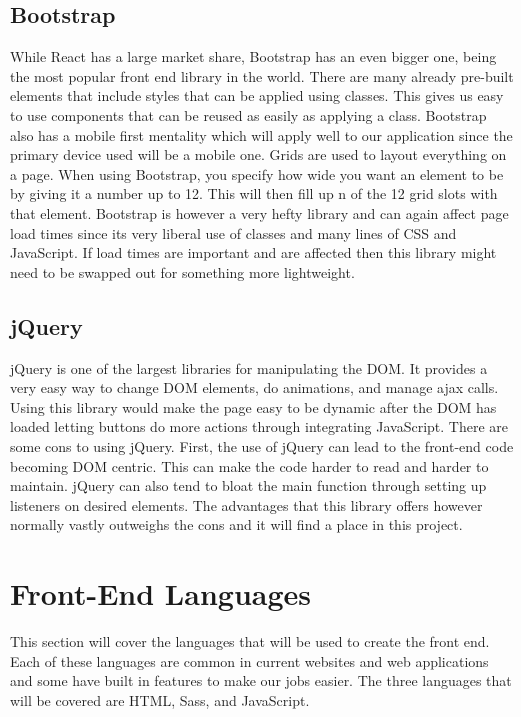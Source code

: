 \documentclass[onecolumn, draftclsnofoot,10pt, compsoc]{IEEEtran}
\begin{document}
\subsection{Bootstrap}
While React has a large market share, Bootstrap has an even bigger one, being the most popular front end library in the world. \cite{3}
There are many already pre-built elements that include styles that can be applied using classes. \cite{3}
This gives us easy to use components that can be reused as easily as applying a class.
Bootstrap also has a mobile first mentality which will apply well to our application since the primary device used will be a mobile one. \cite{3}
Grids are used to layout everything on a page. \cite{3}
When using Bootstrap, you specify how wide you want an element to be by giving it a number up to 12.
This will then fill up n of the 12 grid slots with that element.
Bootstrap is however a very hefty library and can again affect page load times since its very liberal use of classes and many lines of CSS and JavaScript. \cite{4}
If load times are important and are affected then this library might need to be swapped out for something more lightweight.
\subsection{jQuery}
jQuery is one of the largest libraries for manipulating the DOM. \cite{5}
It provides a very easy way to change DOM elements, do animations, and manage ajax calls. \cite{5}
Using this library would make the page easy to be dynamic after the DOM has loaded letting buttons do more actions through integrating JavaScript.
There are some cons to using jQuery.
First, the use of jQuery can lead to the front-end code becoming DOM centric. \cite{6}
This can make the code harder to read and harder to maintain.
jQuery can also tend to bloat the main function through setting up listeners on desired elements. \cite{6}
The advantages that this library offers however normally vastly outweighs the cons and it will find a place in this project.

\section{Front-End Languages}
This section will cover the languages that will be used to create the front end.
Each of these languages are common in current websites and web applications and some have built in features to make our jobs easier.
The three languages that will be covered are HTML, Sass, and JavaScript.
\end{document}
